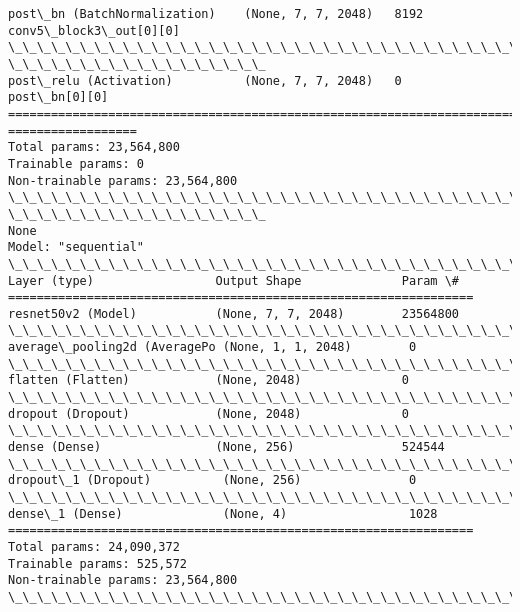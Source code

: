 \documentclass[11pt]{article}
\begin{document}
\begin{Verbatim}[commandchars=\\\{\}]
post\_bn (BatchNormalization)    (None, 7, 7, 2048)   8192
conv5\_block3\_out[0][0]
\_\_\_\_\_\_\_\_\_\_\_\_\_\_\_\_\_\_\_\_\_\_\_\_\_\_\_\_\_\_\_\_\_\_\_\_\_\_\_\_\_\_\_\_\_\_\_\_\_\_\_\_\_\_\_\_\_\_\_\_\_\_\_\_\_\_\_\_\_\_\_\_\_\_\_\_\_\_\_\_
\_\_\_\_\_\_\_\_\_\_\_\_\_\_\_\_\_\_
post\_relu (Activation)          (None, 7, 7, 2048)   0           post\_bn[0][0]
================================================================================
==================
Total params: 23,564,800
Trainable params: 0
Non-trainable params: 23,564,800
\_\_\_\_\_\_\_\_\_\_\_\_\_\_\_\_\_\_\_\_\_\_\_\_\_\_\_\_\_\_\_\_\_\_\_\_\_\_\_\_\_\_\_\_\_\_\_\_\_\_\_\_\_\_\_\_\_\_\_\_\_\_\_\_\_\_\_\_\_\_\_\_\_\_\_\_\_\_\_\_
\_\_\_\_\_\_\_\_\_\_\_\_\_\_\_\_\_\_
None
Model: "sequential"
\_\_\_\_\_\_\_\_\_\_\_\_\_\_\_\_\_\_\_\_\_\_\_\_\_\_\_\_\_\_\_\_\_\_\_\_\_\_\_\_\_\_\_\_\_\_\_\_\_\_\_\_\_\_\_\_\_\_\_\_\_\_\_\_\_
Layer (type)                 Output Shape              Param \#
=================================================================
resnet50v2 (Model)           (None, 7, 7, 2048)        23564800
\_\_\_\_\_\_\_\_\_\_\_\_\_\_\_\_\_\_\_\_\_\_\_\_\_\_\_\_\_\_\_\_\_\_\_\_\_\_\_\_\_\_\_\_\_\_\_\_\_\_\_\_\_\_\_\_\_\_\_\_\_\_\_\_\_
average\_pooling2d (AveragePo (None, 1, 1, 2048)        0
\_\_\_\_\_\_\_\_\_\_\_\_\_\_\_\_\_\_\_\_\_\_\_\_\_\_\_\_\_\_\_\_\_\_\_\_\_\_\_\_\_\_\_\_\_\_\_\_\_\_\_\_\_\_\_\_\_\_\_\_\_\_\_\_\_
flatten (Flatten)            (None, 2048)              0
\_\_\_\_\_\_\_\_\_\_\_\_\_\_\_\_\_\_\_\_\_\_\_\_\_\_\_\_\_\_\_\_\_\_\_\_\_\_\_\_\_\_\_\_\_\_\_\_\_\_\_\_\_\_\_\_\_\_\_\_\_\_\_\_\_
dropout (Dropout)            (None, 2048)              0
\_\_\_\_\_\_\_\_\_\_\_\_\_\_\_\_\_\_\_\_\_\_\_\_\_\_\_\_\_\_\_\_\_\_\_\_\_\_\_\_\_\_\_\_\_\_\_\_\_\_\_\_\_\_\_\_\_\_\_\_\_\_\_\_\_
dense (Dense)                (None, 256)               524544
\_\_\_\_\_\_\_\_\_\_\_\_\_\_\_\_\_\_\_\_\_\_\_\_\_\_\_\_\_\_\_\_\_\_\_\_\_\_\_\_\_\_\_\_\_\_\_\_\_\_\_\_\_\_\_\_\_\_\_\_\_\_\_\_\_
dropout\_1 (Dropout)          (None, 256)               0
\_\_\_\_\_\_\_\_\_\_\_\_\_\_\_\_\_\_\_\_\_\_\_\_\_\_\_\_\_\_\_\_\_\_\_\_\_\_\_\_\_\_\_\_\_\_\_\_\_\_\_\_\_\_\_\_\_\_\_\_\_\_\_\_\_
dense\_1 (Dense)              (None, 4)                 1028
=================================================================
Total params: 24,090,372
Trainable params: 525,572
Non-trainable params: 23,564,800
\_\_\_\_\_\_\_\_\_\_\_\_\_\_\_\_\_\_\_\_\_\_\_\_\_\_\_\_\_\_\_\_\_\_\_\_\_\_\_\_\_\_\_\_\_\_\_\_\_\_\_\_\_\_\_\_\_\_\_\_\_\_\_\_\_
    \end{Verbatim}
\end{document}
